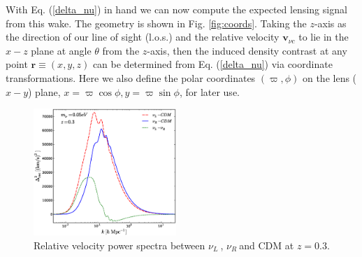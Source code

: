 \documentclass[aps,prl,twocolumn,showpacs,superscriptaddress,groupedaddress,nofootinbib]{revtex4}  %
\newcommand{\nur}{\ensuremath{{\nu_R~}}}
\newcommand{\nul}{\ensuremath{{\nu_L~}}}
\newcommand{\los}{l.o.s.}
\begin{document}
With Eq. (\ref{delta_nu}) in hand we can now
compute the expected lensing signal from this wake. The geometry 
is shown in Fig. \ref{fig:coords}.  Taking the $z$-axis
as the direction of our line of sight (\los) and the relative velocity
$\bm{v}_{\nu c}$ to lie in the $x-z$ plane at angle $\theta$ from
the $z$-axis, then the induced density contrast at any point 
$\bm{r} \equiv (x,y,z)$
can be determined from Eq. (\ref{delta_nu}) via coordinate
transformations.  Here we also define the polar coordinates $(\varpi, \phi)$ on
the lens ($x-y$) plane, $x=\varpi \cos\phi, y=\varpi \sin\phi$, for
later use.  

\begin{figure}[tbp]
  \begin{center}
    \includegraphics[width=0.48\textwidth]{fig_1.eps}
  \end{center}
  \vspace{-0.7cm}
  \caption{Relative velocity power spectra between \nul, \nur and
    CDM at $z=0.3$.}
  \label{fig:relvel}
\end{figure}
\end{document}
